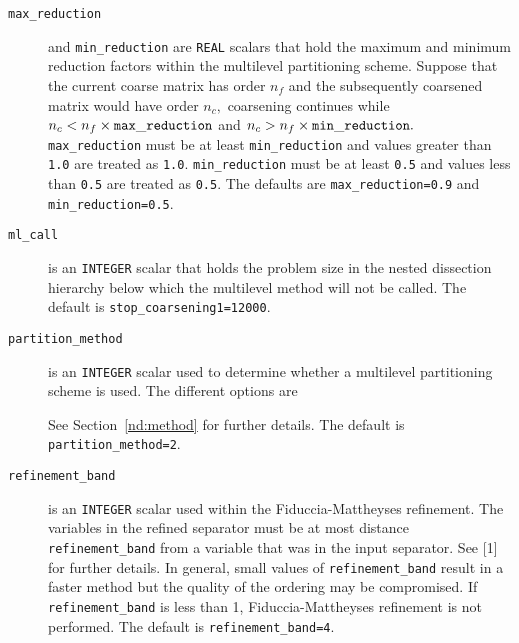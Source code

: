 \begin{description}
\item[\texttt{max\_reduction}] and {\tt min\_reduction} are {\tt REAL} scalars that hold the maximum and minimum reduction factors within the multilevel partitioning scheme. Suppose that the current coarse matrix has order $n_f$ and 
the subsequently coarsened matrix would have order $n_c,$ coarsening continues while $n_c<n_f\times{\tt max\_reduction}$ and 
$n_c>n_f\times{\tt min\_reduction}.$ {\tt max\_reduction} must be at least {\tt min\_reduction} and values greater than 
{\tt 1.0} are treated as {\tt 1.0}. {\tt min\_reduction} must be at least {\tt 0.5} and values less than 
{\tt 0.5} are treated as {\tt 0.5}. The defaults are {\tt max\_reduction=0.9} and {\tt min\_reduction=0.5}.




\item[\texttt{ml\_call}] is an {\tt INTEGER} scalar that holds the problem size in the nested dissection hierarchy below which the multilevel method will not be called.
The default is {\tt stop\_coarsening1=12000}.






\item[\texttt{partition\_method}] is an {\tt INTEGER} scalar used to determine whether a multilevel 
partitioning scheme is used.  The different options are
See Section~\ref{nd:method} for further details. The default is {\tt partition\_method=2}.

\item[\texttt{refinement\_band}] is an {\tt INTEGER} scalar used within the 
Fiduccia-Mattheyses refinement. The variables in the refined separator must be 
at most distance {\tt refinement\_band} from a variable that was in the input 
separator. See [1] for further details. In general, small 
values of {\tt refinement\_band} result in a faster method but the quality of 
the ordering may be compromised. If {\tt refinement\_band} is less than 1, 
Fiduccia-Mattheyses refinement is not performed. The default is 
{\tt refinement\_band=4}.


\end{description}
